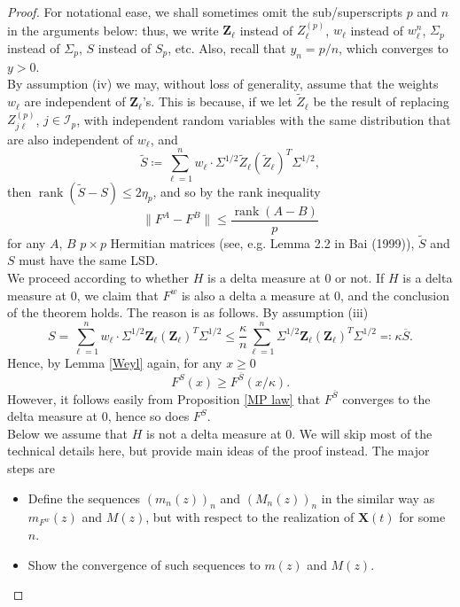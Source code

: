 \documentclass[a4paper,11pt]{book}
\theoremstyle{plain}
\theoremstyle{definition}
\begin{document}
    \begin{proof}
    	For notational ease, we shall sometimes omit the sub/superscripts $p$ and $n$ in the arguments below: thus, we write $\mathbf{Z}_\ell$ instead of $Z_\ell^{(p)}$, $w_\ell$ instead of $w_\ell^n$, $\Sigma_p$ instead of $\Sigma_p$, $S$ instead of $S_p$, etc. Also, recall that $y_n = p/n$, which converges to $y > 0$. \\
    	By assumption (iv) we may, without loss of generality, assume that the weights $w_\ell$ are independent of $\mathbf{Z}_\ell$'s. This is because, if we let $\widetilde{Z}_\ell$ be the result of replacing $Z_{j \ell}^{(p)}$, $j \in \mathcal{I}_p$, with independent random variables with the same distribution that are also independent of $w_\ell$, and
    	\[ \widetilde{S}\coloneqq \sum_{\ell=1}^{n} w_\ell \cdot \Sigma^{1/2} \widetilde{Z}_\ell (\widetilde{Z}_\ell)^T \Sigma^{1/2}, \]
    	then $\operatorname{rank}(\widetilde{S}-S) \leq 2 \eta_p$, and so by the rank inequality
    	\[ \| F^A - F^B \| \leq \frac{\operatorname{rank}(A-B)}{p} \]
    	for any $A$, $B$ $p \times p$ Hermitian matrices (see, e.g. Lemma 2.2 in Bai (1999)), $\widetilde{S}$ and $S$ must have the same LSD. \\
    	We proceed according to whether $H$ is a delta measure at $0$ or not. If $H$ is a delta measure at $0$, we claim that $F^w$ is also a delta a measure at $0$, and the conclusion of the theorem holds. The reason is as follows. By assumption (iii) 
    	\[ S = \sum_{\ell = 1}^{n} w_\ell \cdot \Sigma^{1/2} \mathbf{Z}_\ell (\mathbf{Z}_\ell)^T \Sigma^{1/2} \leq \frac{\kappa}{n} \sum_{\ell=1}^{n}\Sigma^{1/2} \mathbf{Z}_\ell (\mathbf{Z}_\ell)^T \Sigma^{1/2} \eqqcolon \kappa \overline{S}.   \]
    	Hence, by Lemma \ref{Weyl} again, for any $x \geq 0$
    	\[ F^S(x) \geq F^{\overline{S}}(x/\kappa). \]
    	However, it follows easily from Proposition \ref{MP law} that $F^{\overline{S}}$ converges to the delta measure at $0$, hence so does $F^S$. \\
    	Below we assume that $H$ is not a delta measure at $0$. 
    	We will skip most of the technical details here, but provide main ideas of the proof instead. The major steps are
    	\begin{itemize}
    		\item Define the sequences $(m_n(z))_n$ and $(M_n(z))_n$ in the similar way as $m_{F^w}(z)$ and $M(z)$, but with respect to the realization of $\mathbf{X}(t)$ for some $n$.
    		\item Show the convergence of such sequences to $m(z)$ and $M(z)$.

\end{itemize}
\end{proof}
\end{document}
